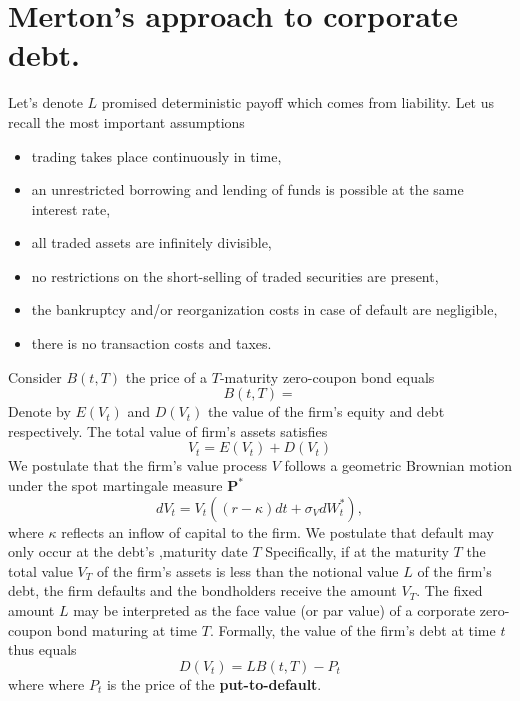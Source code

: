 \documentclass{book}
\begin{document}
\section{Merton's approach to corporate debt.}
Let's denote $L$ promised deterministic payoff which comes from liability.
Let us recall the most important assumptions
\begin{itemize}
\item trading takes place continuously in time,
\item an unrestricted borrowing and lending of funds is possible at the same
interest rate,
\item all traded assets are infinitely divisible,
\item no restrictions on the short-selling of traded securities are present,
\item the bankruptcy and/or reorganization costs in case of default are negligible,
\item there is no transaction costs and taxes.
\end{itemize}
Consider  $B(t,T)$ the price of a $T$-maturity zero-coupon bond equals
$$
B(t,T)=
$$
Denote by $E(V_{t})$ and $D(V_{t})$ the value of the firm's equity and debt respectively. The total value of firm's assets satisfies
$$
V_{t}=E(V_{t})+D(V_{t})
$$
We postulate that the firm's value process $V$ follows a geometric Brownian motion under the spot martingale measure $\mathbf{P^{\ast}}$
$$
dV_{t}=V_{t}((r-\kappa)dt+\sigma_{V}dW^{\ast}_{t}),
$$ 
where $\kappa$ reflects an inflow of capital to the firm. We postulate that default may only occur at the debt's ,maturity date $T$ 
Specifically, if at the maturity $T$ the total value $V_{T}$ of the firm's assets is less than the notional value $L$ of the firm's debt, the firm defaults and the bondholders receive the amount $V_{T}$. The fixed amount $L$ may be interpreted as the face value (or par value) of a
corporate zero-coupon bond maturing at time $T$. Formally, the value of the firm's debt at time $t$ thus equals
$$D(V_{t})=LB(t,T)-P_{t}$$
where where $P_{t}$ is the price of the \textbf{put-to-default}.
\end{document}
